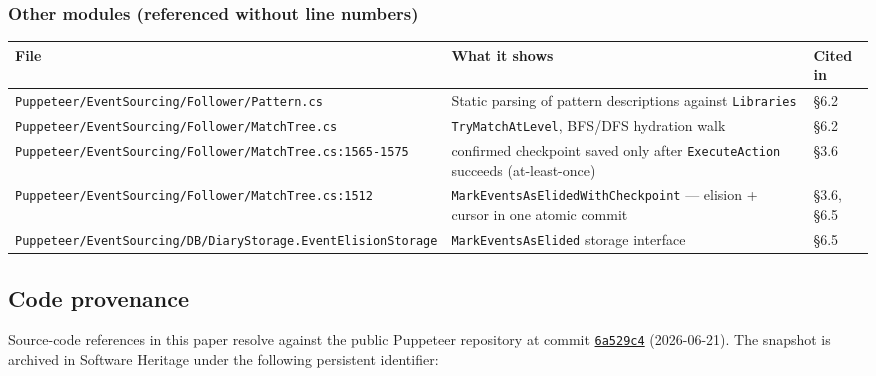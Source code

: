 \documentclass[
]{article}
\newcounter{none} %
\let\origtexttt\texttt%
\renewcommand{\texttt}[1]{\origtexttt{\seqsplit{#1}}}%
\let\texttt\origtexttt%
\begin{document}
\subsubsection{Other modules (referenced without line
numbers)}\label{other-modules-referenced-without-line-numbers}

{\def\LTcaptype{none} %
\begin{longtable}[]{@{}
  >{\raggedright\arraybackslash}p{}
  >{\raggedright\arraybackslash}p{}
  >{\raggedright\arraybackslash}p{}@{}}
\toprule\noalign{}
\begin{minipage}[b]{\linewidth}\raggedright
File
\end{minipage} & \begin{minipage}[b]{\linewidth}\raggedright
What it shows
\end{minipage} & \begin{minipage}[b]{\linewidth}\raggedright
Cited in
\end{minipage} \\
\midrule\noalign{}
\endhead
\bottomrule\noalign{}
\endlastfoot
\texttt{Puppeteer/EventSourcing/Follower/Pattern.cs} & Static parsing of
pattern descriptions against \texttt{Libraries} & §6.2 \\
\texttt{Puppeteer/EventSourcing/Follower/MatchTree.cs} &
\texttt{TryMatchAtLevel}, BFS/DFS hydration walk & §6.2 \\
\texttt{Puppeteer/EventSourcing/Follower/MatchTree.cs:1565-1575} &
confirmed checkpoint saved only after \texttt{ExecuteAction} succeeds
(at-least-once) & §3.6 \\
\texttt{Puppeteer/EventSourcing/Follower/MatchTree.cs:1512} &
\texttt{MarkEventsAsElidedWithCheckpoint} --- elision + cursor in one
atomic commit & §3.6, §6.5 \\
\texttt{Puppeteer/EventSourcing/DB/DiaryStorage.EventElisionStorage} &
\texttt{MarkEventsAsElided} storage interface & §6.5 \\
\end{longtable}
}

\subsection{Code provenance}\label{code-provenance}

Source-code references in this paper resolve against the public
Puppeteer repository at commit
\href{https://github.com/alvaroNCubo/puppeteer/tree/6a529c45367ca2c32a891a067efb5be3fed589ec}{\texttt{6a529c4}}
(2026-06-21). The snapshot is archived in Software Heritage under the
following persistent identifier:
\end{document}
